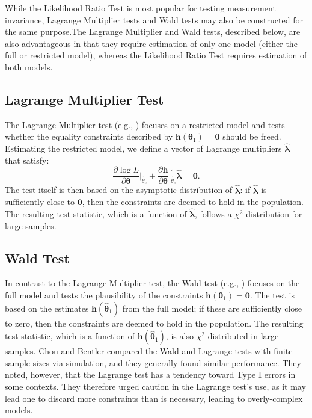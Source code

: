 \documentclass[man]{apa}
\begin{document}
While the Likelihood Ratio Test is most popular for testing
measurement invariance, Lagrange Multiplier tests and Wald tests
may also be constructed for the same purpose.The Lagrange Multiplier and Wald 
tests, described below, are also advantageous in that they require
estimation of only one 
model (either the full or restricted model), whereas the Likelihood
Ratio Test requires estimation of both models.

\subsection{Lagrange Multiplier Test}
The Lagrange Multiplier test (e.g., )
focuses on a restricted model and tests whether the equality
constraints described by ${\bm h}({\bm \theta}_1) = {\bm 0}$ should be
freed.
Estimating the restricted model, we define a vector of Lagrange
multipliers $\widehat{\bm \lambda}$ that satisfy:
\begin{equation}
    \label{eq:lagrange}
    \frac{\partial \log L}{\partial {\bm \theta}} \bigg |_{\widehat{\theta}_c} +
    \frac{\partial {\bm h}}{\partial {\bm \theta}}
    \bigg |_{\widehat{\theta}_c}^{\prime} \widehat{{\bm \lambda}} = {\bm 0}.
\end{equation}
The test itself is then based on the asymptotic distribution of 
$\widehat{{\bm \lambda}}$: if $\widehat{{\bm \lambda}}$ is sufficiently close
to ${\bm 0}$, then the constraints are deemed to hold in the
population.  The resulting test statistic, which is a function of
$\widehat{\bm \lambda}$, follows a $\chi^2$ distribution for large
samples.

\subsection{Wald Test}
In contrast to the Lagrange Multiplier test, the
Wald test (e.g., )
focuses on the full model and tests the plausibility of the
constraints ${\bm h}({\bm \theta}_1) = {\bm 0}$.
The test is based on the estimates ${\bm h}(\widehat{{\bm \theta}}_1)$
from the full model; if
these are sufficiently close to zero, then the constraints are deemed
to hold in the population.  The resulting test statistic, which is a
function of ${\bm h}(\widehat{{\bm \theta}}_1)$, is also
$\chi^2$-distributed in large 
samples.
Chou and Bentler \citeyear{ChouBent90} compared the 
Wald and Lagrange tests with finite sample sizes via
simulation, and they generally found similar
performance.  They noted, 
however, that the Lagrange test has a tendency toward Type I errors in
some contexts.  They therefore urged caution in the Lagrange test's
use, as it may lead one to discard more constraints than is necessary,
leading to overly-complex models.
\end{document}
